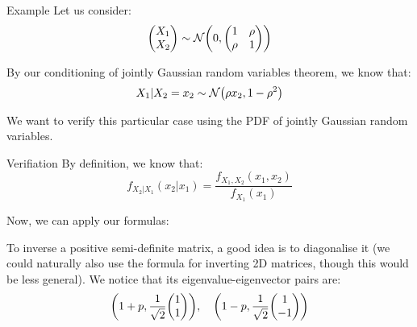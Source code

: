 \documentclass[a4paper]{article}
\begin{document}
\begin{parag}{Example}
    Let us consider: 
    \[\begin{pmatrix} X_1 \\ X_2 \end{pmatrix} \followsdistr \mathcal{N}\left(0, \begin{pmatrix} 1 & \rho \\ \rho & 1 \end{pmatrix} \right)\]
    
    By our conditioning of jointly Gaussian random variables theorem, we know that:
    \[X_1 | X_2 = x_2 \followsdistr \mathcal{N}\left(\rho x_2, 1- \rho^2\right)\]

    We want to verify this particular case using the PDF of jointly Gaussian random variables.

    \begin{subparag}{Verifiation}
        By definition, we know that: 
        \[f_{X_2|X_1}\left(x_2|x_1\right) = \frac{f_{X_1, X_2}\left(x_1, x_2\right)}{f_{X_1}\left(x_1\right)}\]
        
        Now, we can apply our formulas: 
        
        To inverse a positive semi-definite matrix, a good idea is to diagonalise it (we could naturally also use the formula for inverting 2D matrices, though this would be less general). We notice that its eigenvalue-eigenvector pairs are: 
        \[\left(1+p, \frac{1}{\sqrt{2}} \begin{pmatrix} 1 \\ 1 \end{pmatrix} \right), \mathspace \left(1-p, \frac{1}{\sqrt{2}} \begin{pmatrix} 1 \\ -1 \end{pmatrix} \right)\]
        

\end{subparag}
\end{parag}
\end{document}
